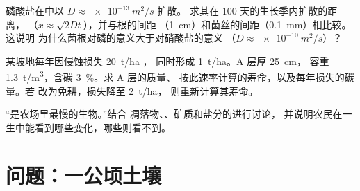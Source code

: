 \begin{exercise}[$\star\star\star$]\label{exo:b2:living-soil:10}
磷酸盐在中以 $D \approx \qty{e-13}{m^2/s}$ 扩散。
求其在 \num{100} 天的生长季内扩散的距离，
（$x \approx \sqrt{2Dt}$），并与根的间距
（\qty{1}{cm}）和菌丝的间距（\qty{0.1}{mm}）相比较。这说明
为什么菌根对磷的意义大于对硝酸盐的意义
（$D \approx \qty{e-10}{m^2/s}$）？
\end{exercise}

\begin{exercise}[$\star\star\star$]\label{exo:b2:living-soil:11}
某坡地每年因侵蚀损失 \qty{20}{t/ha} ，
同时形成 \qty{1}{t/ha}。A 层厚 \qty{25}{cm}，
容重 \qty{1.3}{t/m^3}，含碳 \qty{3}{\%}。求 A 层的质量、
按此速率计算的寿命，以及每年损失的碳量。若
改为免耕，损失降至 \qty{2}{t/ha}，
则重新计算其寿命。
\end{exercise}

\begin{exercise}[$\star\star\star$]\label{exo:b2:living-soil:12}
“是农场里最慢的生物。”结合
凋落物、、矿质和盐分的进行讨论，
并说明农民在一生中能看到哪些变化，哪些则看不到。
\end{exercise}

\section{问题：一公顷土壤}

